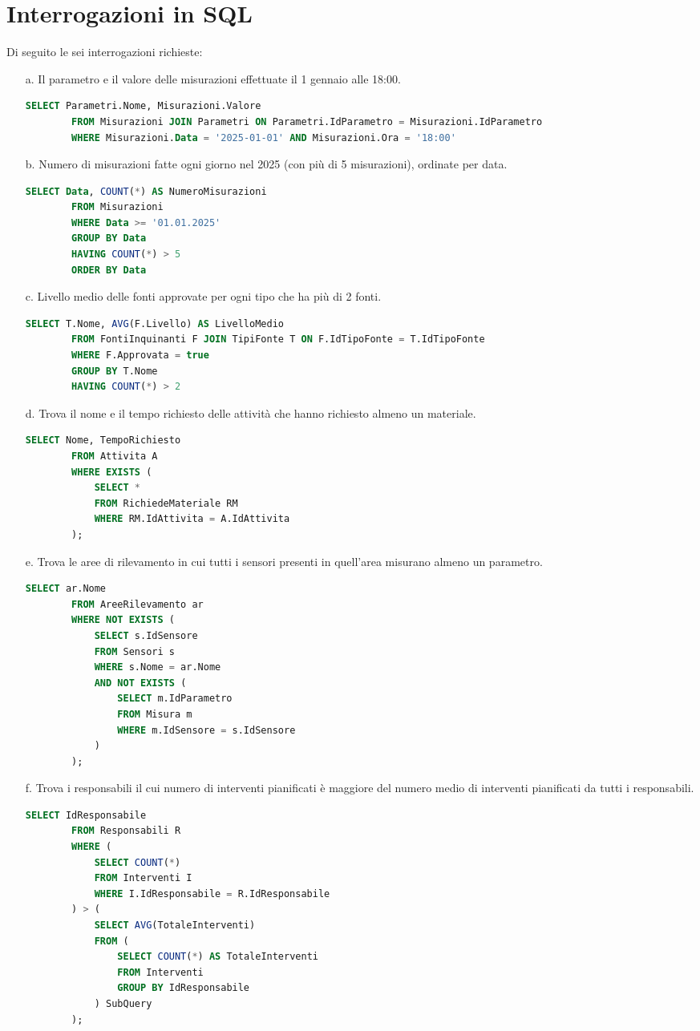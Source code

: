 \section{Interrogazioni in SQL}
Di seguito le sei interrogazioni richieste:
\begin{enumerate}
	\item[a.] Il parametro e il valore delle misurazioni effettuate il 1 gennaio alle 18:00.
	\begin{lstlisting}[language=SQL]
		SELECT Parametri.Nome, Misurazioni.Valore
		FROM Misurazioni JOIN Parametri ON Parametri.IdParametro = Misurazioni.IdParametro
		WHERE Misurazioni.Data = '2025-01-01' AND Misurazioni.Ora = '18:00'
	\end{lstlisting}
	\item[b.] Numero di misurazioni fatte ogni giorno nel 2025 (con più di 5 misurazioni), ordinate per data.
	\begin{lstlisting}[language=SQL]
		SELECT Data, COUNT(*) AS NumeroMisurazioni
		FROM Misurazioni
		WHERE Data >= '01.01.2025'
		GROUP BY Data
		HAVING COUNT(*) > 5
		ORDER BY Data
	\end{lstlisting} 
	\item[c.] Livello medio delle fonti approvate per ogni tipo che ha più di 2 fonti.
	\begin{lstlisting}[language=SQL]
		SELECT T.Nome, AVG(F.Livello) AS LivelloMedio
		FROM FontiInquinanti F JOIN TipiFonte T ON F.IdTipoFonte = T.IdTipoFonte
		WHERE F.Approvata = true
		GROUP BY T.Nome
		HAVING COUNT(*) > 2
	\end{lstlisting} 
	\item[d.] Trova il nome e il tempo richiesto delle attività che hanno richiesto almeno un materiale.
	\begin{lstlisting}[language=SQL]
		SELECT Nome, TempoRichiesto
		FROM Attivita A
		WHERE EXISTS (
			SELECT *
			FROM RichiedeMateriale RM
			WHERE RM.IdAttivita = A.IdAttivita
		);
	\end{lstlisting} 
	\item[e.] Trova le aree di rilevamento in cui tutti i sensori presenti in quell'area misurano almeno un parametro. 
	\begin{lstlisting}[language=SQL]
		SELECT ar.Nome
		FROM AreeRilevamento ar
		WHERE NOT EXISTS (
			SELECT s.IdSensore
			FROM Sensori s
			WHERE s.Nome = ar.Nome
			AND NOT EXISTS (
				SELECT m.IdParametro
				FROM Misura m
				WHERE m.IdSensore = s.IdSensore
			)
		);
	\end{lstlisting} 
	\item[f.] Trova i responsabili il cui numero di interventi pianificati è maggiore del numero medio di interventi pianificati da tutti i responsabili.
	\begin{lstlisting}[language=SQL]
		SELECT IdResponsabile
		FROM Responsabili R
		WHERE (
			SELECT COUNT(*)
			FROM Interventi I
			WHERE I.IdResponsabile = R.IdResponsabile
		) > (
			SELECT AVG(TotaleInterventi)
			FROM (
				SELECT COUNT(*) AS TotaleInterventi
				FROM Interventi
				GROUP BY IdResponsabile
			) SubQuery
		);
	\end{lstlisting} 
\end{enumerate}

